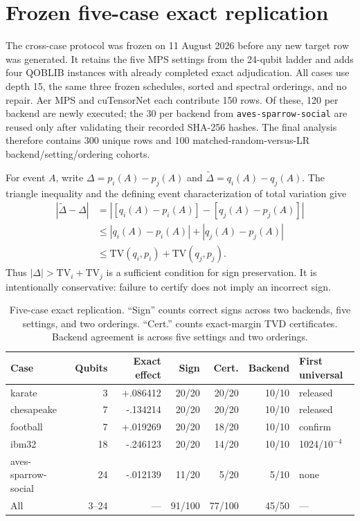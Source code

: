 \documentclass[10pt]{article}
\begin{document}
\FloatBarrier
\section{Frozen five-case exact replication}

The cross-case protocol was frozen on 11 August 2026 before any new target row
was generated. It retains the five MPS settings from the 24-qubit ladder and
adds four QOBLIB instances with already completed exact adjudication. All cases
use depth 15, the same three frozen schedules, sorted and spectral orderings,
and no repair. Aer MPS and cuTensorNet each contribute 150 rows. Of these, 120
per backend are newly executed; the 30 per backend from
\texttt{aves-sparrow-social} are reused only after validating their recorded
SHA-256 hashes. The final analysis therefore contains 300 unique rows and 100
matched-random-versus-LR backend/setting/ordering cohorts.

For event $A$, write $\Delta=p_i(A)-p_j(A)$ and
$\widetilde\Delta=q_i(A)-q_j(A)$. The triangle inequality and the defining
event characterization of total variation give
\begin{align*}
|\widetilde\Delta-\Delta|
&=|[q_i(A)-p_i(A)]-[q_j(A)-p_j(A)]|\\
&\leq |q_i(A)-p_i(A)|+|q_j(A)-p_j(A)|\\
&\leq \mathrm{TV}(q_i,p_i)+\mathrm{TV}(q_j,p_j).
\end{align*}
Thus $|\Delta|>\mathrm{TV}_i+\mathrm{TV}_j$ is a sufficient condition for
sign preservation. It is intentionally conservative: failure to certify does
not imply an incorrect sign.

\begin{table}[h]
\centering
\caption{Five-case exact replication. ``Sign'' counts correct signs across two
backends, five settings, and two orderings. ``Cert.'' counts exact-margin TVD
certificates. Backend agreement is across five settings and two orderings.}
\label{tab:crosscase}
\small
\begin{tabular}{lrrrrrl}
\toprule
Case & Qubits & Exact effect & Sign & Cert. & Backend & First universal \\
\midrule
karate & 3 & +.086412 & 20/20 & 20/20 & 10/10 & released \\
chesapeake & 7 & -.134214 & 20/20 & 20/20 & 10/10 & released \\
football & 7 & +.019269 & 20/20 & 18/20 & 10/10 & confirm \\
ibm32 & 18 & -.246123 & 20/20 & 14/20 & 10/10 & 1024/$10^{-4}$ \\
aves-sparrow-social & 24 & -.012139 & 11/20 & 5/20 & 5/10 & none \\
\midrule
All & 3--24 & --- & 91/100 & 77/100 & 45/50 & --- \\
\bottomrule
\end{tabular}
\end{table}
\end{document}
